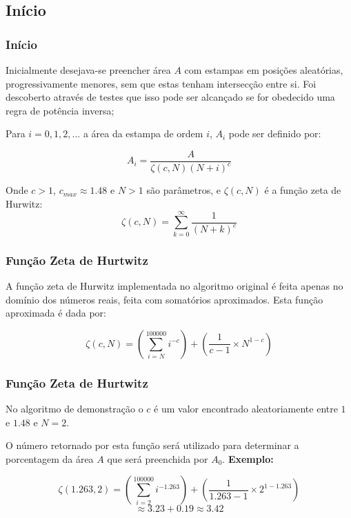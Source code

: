 \documentclass[aspectratio=169]{beamer}
\begin{document}
\subsection{Início}
\begin{frame}
\frametitle{Início}

Inicialmente desejava-se preencher área $A$ com estampas em posições aleatórias, progressivamente menores, sem que estas tenham intersecção entre si. Foi descoberto através de testes que isso pode ser alcançado se for obedecido uma regra de potência inversa;
\medskip
\pause

Para $i=0, 1, 2, ...$ a área da estampa de ordem $i$, $A_{i}$ pode ser definido por:
\medskip

\begin{equation}
A_{i} = \dfrac{A}{\zeta(c,N)(N+i)^c}
\end{equation}
\medskip

Onde $c>1$, $c_{max}\approx1.48$ e $N>1$ são parâmetros, e $\zeta(c,N)$ é a função zeta de Hurwitz: $$\zeta(c,N)=\sum\limits_{k=0}^\infty\dfrac{1}{(N+k)^c}$$
\medskip

\end{frame}

\begin{frame}
\frametitle{Função Zeta de Hurtwitz}

A função zeta de Hurwitz implementada no algoritmo original é feita apenas no domínio dos números reais, feita com somatórios aproximados. Esta função aproximada é dada por:
\medskip

\begin{equation}
\zeta(c,N) = (\sum\limits_{i=N}^{100000} i^{-c})+(\dfrac{1}{c-1} \times N^{1-c})
\end{equation}

\end{frame}

\begin{frame}
\frametitle{Função Zeta de Hurtwitz}

No algoritmo de demonstração o $c$ é um valor encontrado aleatoriamente entre $1$ e $1.48$ e $N=2$.
\medskip

O número retornado por esta função será utilizado para determinar a porcentagem da área $A$ que será preenchida por $A_{0}$. \pause \textbf{Exemplo:}
\medskip

\begin{equation}
\zeta(1.263,2) = (\sum\limits_{i=2}^{100000} i^{-1.263})+(\dfrac{1}{1.263-1} \times 2^{1-1.263})
\end{equation}
$$\approx 3.23 + 0.19 \approx 3.42$$

\end{frame}
\end{document}
